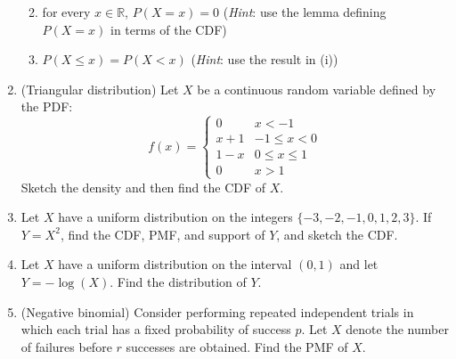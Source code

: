 \documentclass[
  letterpaper,
  DIV=11,
  numbers=noendperiod]{scrartcl}
\providecommand{\tightlist}{%
  \setlength{\itemsep}{0pt}\setlength{\parskip}{0pt}}\usepackage{longtable,booktabs,array}
\begin{document}
\begin{enumerate}
  \begin{enumerate}
  \def\labelenumii{\roman{enumii}.}
  \tightlist
  \item
    for every \(x \in \mathbb{R}\), \(P(X = x) = 0\) (\emph{Hint}: use
    the lemma defining \(P(X = x)\) in terms of the CDF)
  \item
    \(P(X \leq x) = P(X < x)\) (\emph{Hint}: use the result in (i))
  \end{enumerate}
\item
  (Triangular distribution) Let \(X\) be a continuous random variable
  defined by the PDF: \[
  f(x) = \begin{cases}
    0 &x < -1 \\
    x + 1 & -1 \leq x < 0 \\
    1 - x & 0 \leq x \leq 1 \\
    0 & x > 1
  \end{cases}
  \] Sketch the density and then find the CDF of \(X\).
\item
  Let \(X\) have a uniform distribution on the integers
  \(\{-3, -2, -1, 0, 1, 2, 3\}\). If \(Y = X^2\), find the CDF, PMF, and
  support of \(Y\), and sketch the CDF.
\item
  Let \(X\) have a uniform distribution on the interval \((0, 1)\) and
  let \(Y = -\log(X)\). Find the distribution of \(Y\).
\item
  (Negative binomial) Consider performing repeated independent trials in
  which each trial has a fixed probability of success \(p\). Let \(X\)
  denote the number of failures before \(r\) successes are obtained.
  Find the PMF of \(X\).
\end{enumerate}
\end{document}
